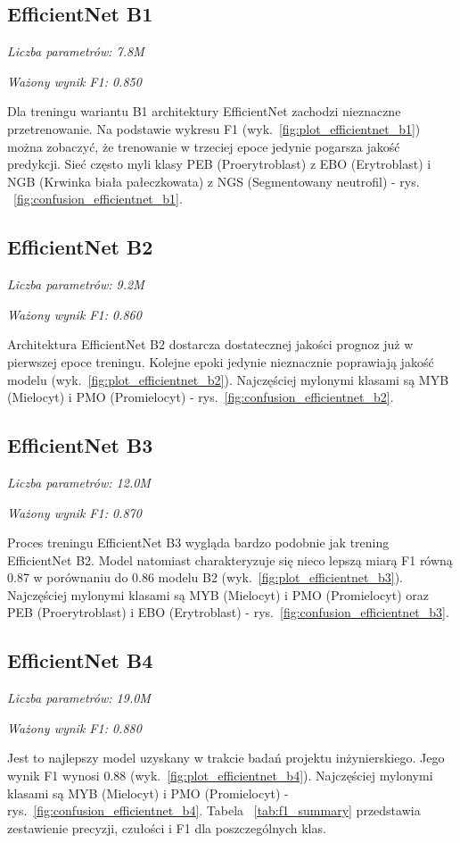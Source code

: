\subsection{EfficientNet B1}
\textit{Liczba parametrów: 7.8M}

\textit{Ważony wynik F1: 0.850}

Dla treningu wariantu B1 architektury EfficientNet zachodzi nieznaczne przetrenowanie.
Na podstawie wykresu F1 (wyk.~\ref{fig:plot_efficientnet_b1}) można zobaczyć, że trenowanie w trzeciej epoce jedynie pogarsza jakość predykcji.
Sieć często myli klasy PEB (Proerytroblast) z EBO (Erytroblast) i NGB (Krwinka biała pałeczkowata) z NGS (Segmentowany neutrofil) - rys. ~\ref{fig:confusion_efficientnet_b1}.

\subsection{EfficientNet B2}
\textit{Liczba parametrów: 9.2M}

\textit{Ważony wynik F1: 0.860}

Architektura EfficientNet B2 dostarcza dostatecznej jakości prognoz już w pierwszej epoce treningu.
Kolejne epoki jedynie nieznacznie poprawiają jakość modelu (wyk.~\ref{fig:plot_efficientnet_b2}).
Najczęściej mylonymi klasami są MYB (Mielocyt) i PMO (Promielocyt) - rys.~\ref{fig:confusion_efficientnet_b2}.

\subsection{EfficientNet B3}
\textit{Liczba parametrów: 12.0M}

\textit{Ważony wynik F1: 0.870}

Proces treningu EfficientNet B3 wygląda bardzo podobnie jak trening EfficientNet B2. Model natomiast charakteryzuje się nieco lepszą miarą F1 równą 0.87 w porównaniu do 0.86 modelu B2 (wyk.~\ref{fig:plot_efficientnet_b3}). Najczęściej mylonymi klasami są MYB (Mielocyt) i PMO (Promielocyt) oraz PEB (Proerytroblast) i EBO (Erytroblast) - rys.~\ref{fig:confusion_efficientnet_b3}.

\subsection{EfficientNet B4}
\textit{Liczba parametrów: 19.0M}

\textit{Ważony wynik F1: 0.880}

Jest to najlepszy model uzyskany w trakcie badań projektu inżynierskiego.
Jego wynik F1 wynosi 0.88 (wyk.~\ref{fig:plot_efficientnet_b4}). Najczęściej mylonymi klasami są MYB (Mielocyt) i PMO (Promielocyt) - rys.~\ref{fig:confusion_efficientnet_b4}.
Tabela ~\ref{tab:f1_summary} przedstawia zestawienie precyzji, czułości i F1 dla poszczególnych klas.

